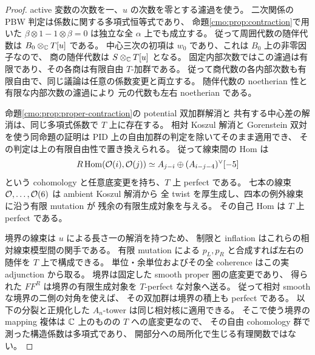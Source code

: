 \begin{proof}
active 変数の次数を一、$u$ の次数を零とする濾過を使う。
二次関係の PBW 判定は係数に関する多項式恒等式であり、
命題\ref{cmo:prop:contraction}で用いた
$\beta\otimes1-1\otimes\beta=0$ は独立な全 $\alpha$ 上でも成立する。
従って周囲代数の随伴代数は $B_0\otimes_\mathbb C T[u]$ である。
中心三次の初項は $w_0$ であり、これは $B_0$ 上の非零因子なので、
商の随伴代数は $S\otimes_\mathbb C T[u]$ となる。
固定内部次数ではこの濾過は有限であり、その各商は有限自由 $T$-加群である。
従って商代数の各内部次数も有限自由で、同じ議論は任意の係数変更と両立する。
随伴代数の noetherian 性と有限な内部次数の濾過により
元の代数も左右 noetherian である。

命題\ref{cmo:prop:proper-contraction}の potential 双加群解消と
共有する中心差の解消は、同じ多項式係数で $T$ 上に存在する。
相対 Koszul 解消と Gorenstein 双対を使う同命題の証明は
PID 上の自由加群の判定を除いてそのまま適用でき、
その判定は上の有限自由性で置き換えられる。
従って線束間の Hom は
\[
 R\operatorname{Hom}(\mathcal O(i),\mathcal O(j))
 \simeq A_{j-i}\oplus(A_{i-j-4})^\vee[-5]
\]
という cohomology と任意底変更を持ち、$T$ 上 perfect である。
七本の線束 $\mathcal O,\ldots,\mathcal O(6)$ は ambient Koszul 解消から
全 twist を厚生成し、四本の例外線束に沿う有限 mutation が
残余の有限生成対象を与える。
その自己 Hom は $T$ 上 perfect である。

境界の線束は $u$ による長さ一の解消を持つため、
制限と inflation はこれらの相対線束模型間の関手である。
有限 mutation による $p_L,p_R$ と合成すれば左右の随伴を $T$ 上で構成できる。
単位・余単位およびその全 coherence はこの実 adjunction から取る。
境界は固定した smooth proper 圏の底変更であり、
得られた $FF^R$ は境界の有限生成対象を $T$-perfect な対象へ送る。
従って相対 smooth な境界の二側の対角を使えば、
その双加群は境界の積上も perfect である。
以下の分裂と正規化した $A_n$-tower は同じ相対核に適用できる。
そこで使う境界の mapping 複体は $\mathbb C$ 上のものの $T$ への底変更なので、
その自由 cohomology 群で測った構造係数は多項式であり、
開部分への局所化で生じる有理関数ではない。
\end{proof}

